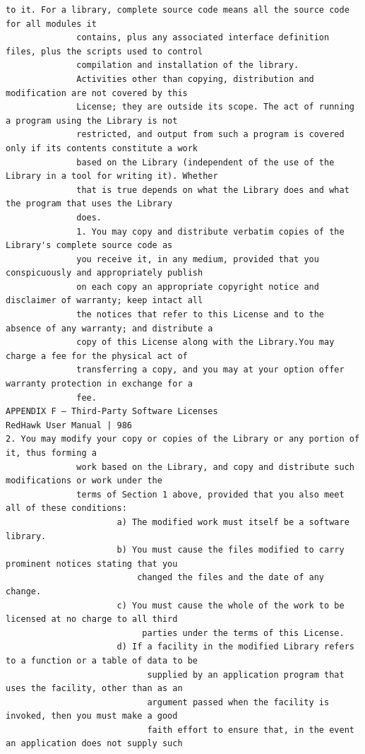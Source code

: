 \begin{lstlisting}[basicstyle=\ttfamily\scriptsize,breaklines=true]
              to it. For a library, complete source code means all the source code for all modules it
              contains, plus any associated interface definition files, plus the scripts used to control
              compilation and installation of the library.
              Activities other than copying, distribution and modification are not covered by this
              License; they are outside its scope. The act of running a program using the Library is not
              restricted, and output from such a program is covered only if its contents constitute a work
              based on the Library (independent of the use of the Library in a tool for writing it). Whether
              that is true depends on what the Library does and what the program that uses the Library
              does.
              1. You may copy and distribute verbatim copies of the Library's complete source code as
              you receive it, in any medium, provided that you conspicuously and appropriately publish
              on each copy an appropriate copyright notice and disclaimer of warranty; keep intact all
              the notices that refer to this License and to the absence of any warranty; and distribute a
              copy of this License along with the Library.You may charge a fee for the physical act of
              transferring a copy, and you may at your option offer warranty protection in exchange for a
              fee.
APPENDIX F — Third-Party Software Licenses                                      RedHawk User Manual | 986
2. You may modify your copy or copies of the Library or any portion of it, thus forming a
              work based on the Library, and copy and distribute such modifications or work under the
              terms of Section 1 above, provided that you also meet all of these conditions:
                      a) The modified work must itself be a software library.
                      b) You must cause the files modified to carry prominent notices stating that you
                          changed the files and the date of any change.
                      c) You must cause the whole of the work to be licensed at no charge to all third
                           parties under the terms of this License.
                      d) If a facility in the modified Library refers to a function or a table of data to be
                            supplied by an application program that uses the facility, other than as an
                            argument passed when the facility is invoked, then you must make a good
                            faith effort to ensure that, in the event an application does not supply such

\end{lstlisting}
